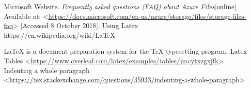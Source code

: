 \documentclass[12pt]{report}
\begin{document}
Microsoft Website. \textit{Frequently asked questions (FAQ) about Azure Files}[online] Available at: <\url{https://docs.microsoft.com/en-us/azure/storage/files/storage-files-faq}> [Accessed 8 October 2018].
\newline
\newline
Using Latex
https://en.wikipedia.org/wiki/LaTeX
\newline
\newline
\maketitle
  \LaTeX{} is a document preparation system for
  the \TeX{} typesetting program.
Latex Tables
\newline
<\url{https://www.overleaf.com/latex/examples/tables/jmcytxzgxjfk}>
\newline
Indenting a whole paragraph
\newline
<\url{https://tex.stackexchange.com/questions/35933/indenting-a-whole-paragraph}>
\end{document}
